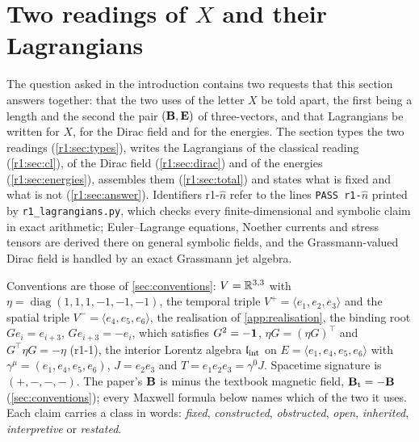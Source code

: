 
\section{Two readings of \texorpdfstring{$X$}{X} and their Lagrangians}
\label{r1:sec:main}

The question asked in the introduction contains two requests that this section answers together: that the two uses of the letter $X$
be told apart, the first being a length and the second the pair $(\mathbf B,\mathbf E)$ of three-vectors, and that Lagrangians be written for $X$, for the Dirac field
and for the energies. The section types the two readings (\cref{r1:sec:types}), writes the Lagrangians of the classical reading
(\cref{r1:sec:cl}), of the Dirac field (\cref{r1:sec:dirac}) and of the energies (\cref{r1:sec:energies}), assembles them
(\cref{r1:sec:total}) and states what is fixed and what is not (\cref{r1:sec:answer}). Identifiers r1-$\hat n$ refer to the lines
\texttt{PASS r1-$\hat n$} printed by \texttt{r1\_lagrangians.py}, which checks every finite-dimensional and symbolic claim in exact
arithmetic; Euler--Lagrange equations, Noether currents and stress tensors are derived there on general symbolic fields, and the
Grassmann-valued Dirac field is handled by an exact Grassmann jet algebra.

Conventions are those of \cref{sec:conventions}: $V=\mathbb{R}^{3,3}$ with $\eta=\operatorname{diag}(1,1,1,\allowbreak-1,-1,-1)$, the temporal triple
$V^+=\langle e_1,e_2,e_3\rangle$ and the spatial triple $V^-=\langle e_4,e_5,e_6\rangle$, the realisation of \cref{app:realisation},
the binding root $Ge_i=e_{i+3}$, $Ge_{i+3}=-e_i$, which satisfies $G^2=-\mathbf 1$, $\eta G=(\eta G)^{\!\top}$ and $G^{\!\top}\eta G=-\eta$
(r1-1), the interior Lorentz algebra $\mathfrak l_{\rm int}$ on $E=\langle e_1,e_4,e_5,e_6\rangle$ with $\gamma^\mu=(e_1,e_4,e_5,e_6)$, $J=e_2e_3$ and
$T=e_1e_2e_3=\gamma^0J$. Spacetime signature is $(+,-,-,-)$. The paper's $\mathbf B$ is minus the textbook magnetic field,
$\mathbf B_{\rm t}=-\mathbf B$ (\cref{sec:conventions}); every Maxwell formula below names which of the two it uses. Each claim carries a class in
words: \emph{fixed}, \emph{constructed}, \emph{obstructed}, \emph{open}, \emph{inherited}, \emph{interpretive} or \emph{restated}.

